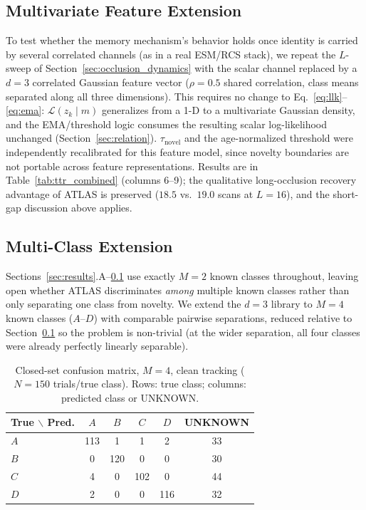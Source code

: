 \documentclass[conference]{IEEEtran}
\begin{document}
\subsection{Multivariate Feature Extension}
\label{sec:multivariate}
To test whether the memory mechanism's behavior holds once identity is carried by several correlated channels (as in a real ESM/RCS stack), we repeat the $L$-sweep of Section~\ref{sec:occlusion_dynamics} with the scalar channel replaced by a $d=3$ correlated Gaussian feature vector ($\rho=0.5$ shared correlation, class means separated along all three dimensions). This requires no change to Eq.~\eqref{eq:llk}--\eqref{eq:ema}: $\mathcal{L}(z_k\mid m)$ generalizes from a 1-D to a multivariate Gaussian density, and the EMA/threshold logic consumes the resulting scalar log-likelihood unchanged (Section~\ref{sec:relation}). $\tau_{\text{novel}}$ and the age-normalized threshold were independently recalibrated for this feature model, since novelty boundaries are not portable across feature representations. Results are in Table~\ref{tab:ttr_combined} (columns 6--9); the qualitative long-occlusion recovery advantage of ATLAS is preserved ($18.5$ vs.\ $19.0$ scans at $L=16$), and the short-gap discussion above applies.

\subsection{Multi-Class Extension}
\label{sec:multiclass}
Sections~\ref{sec:results}.A--\ref{sec:multivariate} use exactly $M=2$ known classes throughout, leaving open whether ATLAS discriminates \emph{among} multiple known classes rather than only separating one class from novelty. We extend the $d=3$ library to $M=4$ known classes ($A$--$D$) with comparable pairwise separations, reduced relative to Section~\ref{sec:multivariate} so the problem is non-trivial (at the wider separation, all four classes were already perfectly linearly separable).

\begin{table}[!t]
\small
\caption{Closed-set confusion matrix, $M=4$, clean tracking ($N=150$ trials/true class). Rows: true class; columns: predicted class or UNKNOWN.}
\label{tab:confusion}
\centering
\begin{tabular}{lccccc}
\toprule
True $\backslash$ Pred. & $A$ & $B$ & $C$ & $D$ & UNKNOWN \\
\midrule
$A$ & 113 & 1 & 1 & 2 & 33 \\
$B$ & 0 & 120 & 0 & 0 & 30 \\
$C$ & 4 & 0 & 102 & 0 & 44 \\
$D$ & 2 & 0 & 0 & 116 & 32 \\
\bottomrule
\end{tabular}
\end{table}
\end{document}
